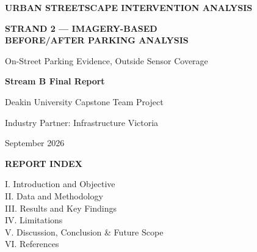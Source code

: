 \documentclass[10pt,conference]{IEEEtran}
\begin{document}
\begin{titlepage}
\thispagestyle{fancy}
\vspace*{4cm}
\begin{center}
{\LARGE \bfseries URBAN STREETSCAPE INTERVENTION ANALYSIS \par}
\vspace{0.3cm}
{\LARGE \bfseries STRAND 2 --- IMAGERY-BASED\\BEFORE/AFTER PARKING ANALYSIS\par}
\vspace{0.6cm}
{\large On-Street Parking Evidence, Outside Sensor Coverage \par}
\vspace{1.2cm}
{\bfseries \large Stream B Final Report \par}
\vspace{0.3cm}
Deakin University Capstone Team Project \par
Industry Partner: Infrastructure Victoria \par
\vspace{2cm}
September 2026
\end{center}
\end{titlepage}

\newpage
\thispagestyle{fancy}
\begin{center}
{\LARGE \bfseries REPORT INDEX \par}
\end{center}
\vspace{0.3cm}
\noindent
I. Introduction and Objective \\
II. Data and Methodology \\
III. Results and Key Findings \\
IV. Limitations \\
V. Discussion, Conclusion \& Future Scope \\
VI. References \\

\newpage
{}
\end{document}
